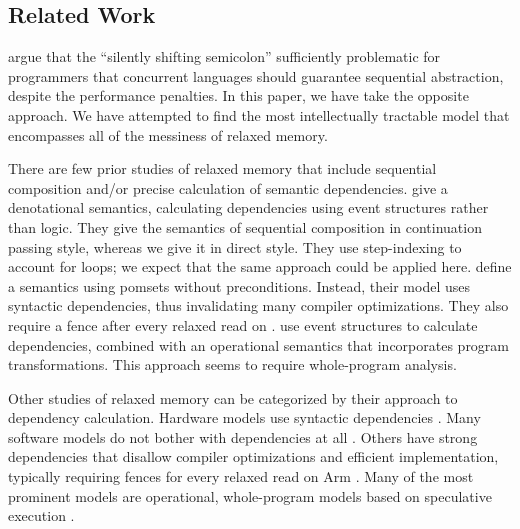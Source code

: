 \subsection{Related Work}

\citet{DBLP:conf/snapl/MarinoMMNS15} argue that the ``silently shifting
semicolon'' sufficiently problematic for programmers that concurrent
languages should guarantee sequential abstraction, despite the performance
penalties.  In this paper, we have take the opposite approach.  We have
attempted to find the most intellectually tractable model that encompasses
all of the messiness of relaxed memory.

There are few prior studies of relaxed memory that include sequential
composition and/or precise calculation of semantic dependencies.
\citet{DBLP:conf/esop/PaviottiCPWOB20} give a denotational semantics,
calculating dependencies using event structures rather than logic.  They give
the semantics of sequential composition in continuation passing style,
whereas we give it in direct style.
They use step-indexing to account for
loops; we expect that the same approach could be applied here.
%
\citet{DBLP:journals/corr/abs-1804-04214} define a semantics
using pomsets without preconditions. Instead, their model uses syntactic
dependencies, thus invalidating many compiler optimizations.  They also
require a fence after every relaxed read on \armeight{}.
%
\citet{Pichon-Pharabod:2016:CSR:2837614.2837616} use event structures to
calculate dependencies, combined with an operational semantics that
incorporates program transformations.  This approach seems to require
whole-program analysis.

Other studies of relaxed memory can be categorized by their approach to
dependency calculation.  Hardware models use syntactic dependencies
\cite{alglave}.  Many software models do not bother with dependencies at all
\cite{Batty:2011:MCC:1926385.1926394, DBLP:journals/pacmpl/WattRP19,
  DBLP:conf/pldi/WattPPBDFPG20, goMM}.  Others have strong dependencies that
disallow compiler optimizations and efficient implementation, typically
requiring fences for every relaxed read on Arm
\cite{Lamport:1979:MMC:1311099.1311750, DBLP:conf/pldi/LahavVKHD17,
  Dolan:2018:BDR:3192366.3192421, DBLP:conf/lics/JeffreyR16,
  Boehm:2014:OGA:2618128.2618134}. %
%
Many of the most prominent models are operational, whole-program models based
on speculative execution \cite{Manson:2005:JMM:1047659.1040336,
  DBLP:conf/esop/JagadeesanPR10,
  DBLP:conf/popl/KangHLVD17,DBLP:journals/pacmpl/ChakrabortyV19,DBLP:conf/pldi/LeeCPCHLV20,promising-ldrf}.

